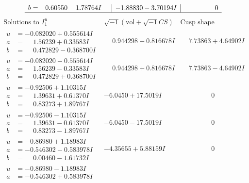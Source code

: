 \documentclass[1p]{elsarticle_modified}
\theoremstyle{definition}
\newcommand{\I}{\sqrt{-1}}
\begin{document}
$$\begin{array}{c|c|c}
\begin{aligned}
b &= \phantom{-}0.60550 - 1.78764 I\end{aligned}
 & -1.88830 - 3.70194 I & \phantom{-0.000000 } 0\\
 \hline 
 \end{array}$$\newpage$$\begin{array}{c|c|c}  
\text{Solutions to }I^u_{1}& \I (\text{vol} + \sqrt{-1}CS) & \text{Cusp shape}\\
 \hline 
\begin{aligned}
u &= -0.082020 + 0.555614 I \\
a &= \phantom{-}1.56239 + 0.33583 I \\
b &= \phantom{-}0.472829 - 0.368700 I\end{aligned}
 & \phantom{-}0.944298 - 0.816678 I & \phantom{-}7.73863 + 4.64902 I \\ \hline\begin{aligned}
u &= -0.082020 - 0.555614 I \\
a &= \phantom{-}1.56239 - 0.33583 I \\
b &= \phantom{-}0.472829 + 0.368700 I\end{aligned}
 & \phantom{-}0.944298 + 0.816678 I & \phantom{-}7.73863 - 4.64902 I \\ \hline\begin{aligned}
u &= -0.92506 + 1.10315 I \\
a &= \phantom{-}1.39631 + 0.61370 I \\
b &= \phantom{-}0.83273 + 1.89767 I\end{aligned}
 & -6.0450 + 17.5019 I & \phantom{-0.000000 } 0 \\ \hline\begin{aligned}
u &= -0.92506 - 1.10315 I \\
a &= \phantom{-}1.39631 - 0.61370 I \\
b &= \phantom{-}0.83273 - 1.89767 I\end{aligned}
 & -6.0450 - 17.5019 I & \phantom{-0.000000 } 0 \\ \hline\begin{aligned}
u &= -0.86980 + 1.18983 I \\
a &= -0.546302 - 0.583978 I \\
b &= \phantom{-}0.00460 - 1.61732 I\end{aligned}
 & -4.35655 + 5.88159 I & \phantom{-0.000000 } 0 \\ \hline\begin{aligned}
u &= -0.86980 - 1.18983 I \\
a &= -0.546302 + 0.583978 I \\

\end{aligned}
\end{array}$$
\end{document}
